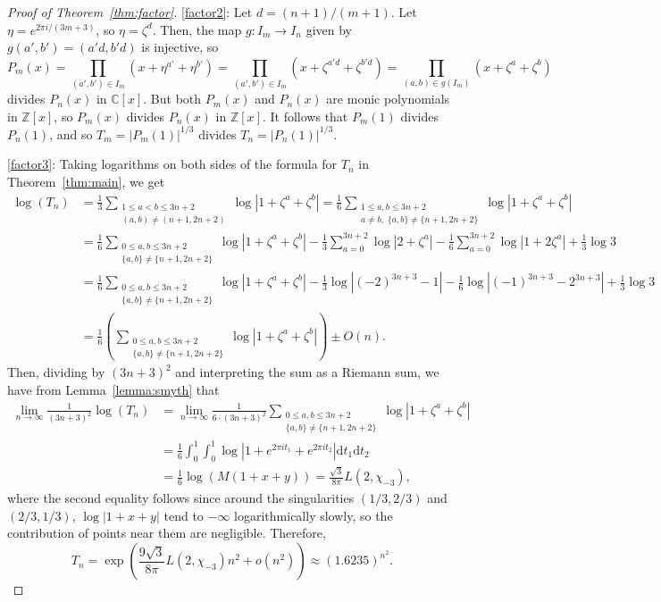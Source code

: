 \documentclass{article}
\begin{document}
\begin{proof}[Proof of Theorem~\ref{thm:factor}]
\ref{factor2}: Let $d=(n+1)/(m+1)$. Let $\eta=e^{2\pi i/(3m+3)}$, so $\eta=\zeta^d$. Then, the map $g:I_m\to I_n$ given by $g(a',b')=(a'd,b'd)$ is injective, so
\[P_m(x)=\prod_{(a',b')\in I_m}(x+\eta^{a'}+\eta^{b'})=\prod_{(a',b')\in I_m}(x+\zeta^{a'd}+\zeta^{b'd})=\prod_{(a,b)\in g(I_m)}(x+\zeta^{a}+\zeta^{b})\]
divides $P_n(x)$ in $\mathbb{C}[x]$. But both $P_m(x)$ and $P_n(x)$ are monic polynomials in $\mathbb{Z}[x]$, so $P_m(x)$ divides $P_n(x)$ in $\mathbb{Z}[x]$. It follows that $P_m(1)$ divides $P_n(1)$, and so $T_m=|P_m(1)|^{1/3}$ divides $T_n=|P_n(1)|^{1/3}$.


\ref{factor3}: Taking logarithms on both sides of the formula for $T_n$ in Theorem~\ref{thm:main}, we get
\begin{align*}
\log(T_n)&=\frac13\sum_{\substack{1\leq a<b\leq 3n+2\\(a,b)\not=(n+1,2n+2)}}\log|1+\zeta^a+\zeta^b|=\frac16\sum_{\substack{1\leq a,b\leq 3n+2\\a\not=b,\;\{a,b\}\not=\{n+1,2n+2\}}}\log|1+\zeta^a+\zeta^b|\\
&=\frac16\sum_{\substack{0\leq a,b\leq 3n+2\\\{a,b\}\not=\{n+1,2n+2\}}}\log|1+\zeta^a+\zeta^b|-\frac13\sum_{a=0}^{3n+2}\log|2+\zeta^a|-\frac16\sum_{a=0}^{3n+2}\log|1+2\zeta^a|+\frac13\log 3\\
&=\frac16\sum_{\substack{0\leq a,b\leq 3n+2\\\{a,b\}\not=\{n+1,2n+2\}}}\log|1+\zeta^a+\zeta^b|-\frac13\log|(-2)^{3n+3}-1|-\frac16\log|(-1)^{3n+3}-2^{3n+3}|+\frac13\log 3\\
&=\frac16\left(\sum_{\substack{0\leq a,b\leq 3n+2\\\{a,b\}\not=\{n+1,2n+2\}}}\log|1+\zeta^a+\zeta^b|\right)\pm O(n).
\end{align*}
Then, dividing by $(3n+3)^2$ and interpreting the sum as a Riemann sum, we have from Lemma~\ref{lemma:smyth} that
\begin{align*}
\lim_{n\to\infty}\frac1{(3n+3)^2}\log(T_n)&=\lim_{n\to\infty}\frac1{6\cdot(3n+3)^2}\sum_{\substack{0\leq a,b\leq 3n+2\\\{a,b\}\not=\{n+1,2n+2\}}}\log|1+\zeta^a+\zeta^b|\\
&=\frac16\int_{0}^1\int_{0}^1\log|1+e^{2\pi it_1}+e^{2\pi i t_2}|\text{d}t_1\text{d}t_2\\
&=\frac16\log(M(1+x+y))=\frac{\sqrt 3}{8\pi}L(2,\chi_{-3}),
\end{align*}
where the second equality follows since around the singularities $(1/3,2/3)$ and $(2/3,1/3)$, $\log|1+x+y|$ tend to $-\infty$ logarithmically slowly, so the contribution of points near them are negligible. 
Therefore,
\[T_n=\exp\left(\frac{9\sqrt 3}{8\pi}L(2,\chi_{-3})n^2+o(n^2)\right)\approx(1.6235)^{n^2}.\]



\end{proof}
\end{document}
